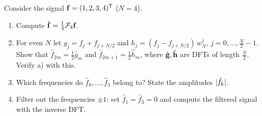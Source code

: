 Consider the signal $\mathbf{f}=(1,2,3,4)^{\mathsf{T}}$ ($N=4$).
\begin{enumerate}
\item Compute $\hat{\mathbf{f}}=\frac14\mathcal{F}_4\mathbf{f}$.
\item For even $N$ let $g_j=f_j+f_{j+N/2}$ and $h_j=(f_j-f_{j+N/2})\,w_N^j$, $j=0,\dots,\frac N2-1$. Show that $\hat f_{2m}=\frac12\hat g_m$ and $\hat f_{2m+1}=\frac12\hat h_m$, where $\hat{\mathbf{g}},\hat{\mathbf{h}}$ are DFTs of length $\frac N2$. Verify a) with this.
\item Which frequencies do $\hat f_0,\dots,\hat f_3$ belong to? State the amplitudes $\lvert \hat f_k\rvert$.
\item Filter out the frequencies $\pm1$: set $\hat f_1=\hat f_3=0$ and compute the filtered signal with the inverse DFT.
\end{enumerate}

